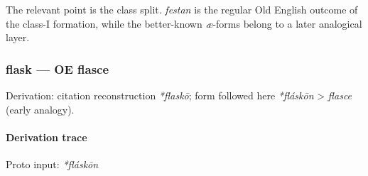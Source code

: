 \documentclass[
  british,
  a4paper,
]{article}
\begin{document}
The relevant point is the class split. \emph{festan} is the regular Old
English outcome of the class-I formation, while the better-known
\emph{æ}-forms belong to a later analogical layer.

\subsubsection{flask --- OE flasce}\label{flask-oe-flasce}

Derivation: citation reconstruction \emph{*flaskō}; form followed here
\emph{*fláskōn} \textgreater{} \emph{flasce} (early analogy).

\paragraph{Derivation trace}\label{derivation-trace-10}

Proto input: \emph{*fláskōn}

\begingroup
\setlength{\fboxsep}{6pt}
\end{document}
